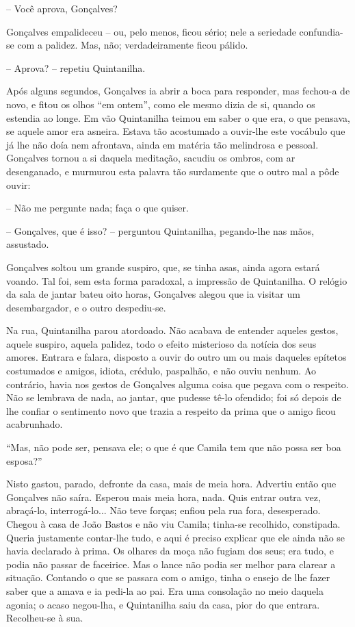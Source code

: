 -- Você aprova, Gonçalves?

Gonçalves empalideceu -- ou, pelo menos, ficou sério; nele a seriedade
confundia-se com a palidez. Mas, não; verdadeiramente ficou pálido.

-- Aprova? -- repetiu Quintanilha.

Após alguns segundos, Gonçalves ia abrir a boca para responder, mas
fechou-a de novo, e fitou os olhos ``em ontem'', como ele mesmo dizia de
si, quando os estendia ao longe. Em vão Quintanilha teimou em saber o
que era, o que pensava, se aquele amor era asneira. Estava tão
acostumado a ouvir-lhe este vocábulo que já lhe não doía nem afrontava,
ainda em matéria tão melindrosa e pessoal. Gonçalves tornou a si daquela
meditação, sacudiu os ombros, com ar desenganado, e murmurou esta
palavra tão surdamente que o outro mal a pôde ouvir:

-- Não me pergunte nada; faça o que quiser.

-- Gonçalves, que é isso? -- perguntou Quintanilha, pegando-lhe nas
mãos, assustado.

Gonçalves soltou um grande suspiro, que, se tinha asas, ainda agora
estará voando. Tal foi, sem esta forma paradoxal, a impressão de
Quintanilha. O relógio da sala de jantar bateu oito horas, Gonçalves
alegou que ia visitar um desembargador, e o outro despediu-se.

Na rua, Quintanilha parou atordoado. Não acabava de entender aqueles
gestos, aquele suspiro, aquela palidez, todo o efeito misterioso da
notícia dos seus amores. Entrara e falara, disposto a ouvir do outro um
ou mais daqueles epítetos costumados e amigos, idiota, crédulo,
paspalhão, e não ouviu nenhum. Ao contrário, havia nos gestos de
Gonçalves alguma coisa que pegava com o respeito. Não se lembrava de
nada, ao jantar, que pudesse tê-lo ofendido; foi só depois de lhe
confiar o sentimento novo que trazia a respeito da prima que o amigo
ficou acabrunhado.

``Mas, não pode ser, pensava ele; o que é que Camila tem que não possa
ser boa esposa?''

Nisto gastou, parado, defronte da casa, mais de meia hora. Advertiu
então que Gonçalves não saíra. Esperou mais meia hora, nada. Quis entrar
outra vez, abraçá-lo, interrogá-lo... Não teve forças; enfiou pela rua
fora, desesperado. Chegou à casa de João Bastos e não viu Camila;
tinha-se recolhido, constipada. Queria justamente contar-lhe tudo, e
aqui é preciso explicar que ele ainda não se havia declarado à prima. Os
olhares da moça não fugiam dos seus; era tudo, e podia não passar de
faceirice. Mas o lance não podia ser melhor para clarear a situação.
Contando o que se passara com o amigo, tinha o ensejo de lhe fazer saber
que a amava e ia pedi-la ao pai. Era uma consolação no meio daquela
agonia; o acaso negou-lha, e Quintanilha saiu da casa, pior do que
entrara. Recolheu-se à sua.

